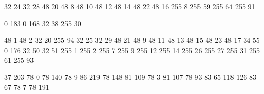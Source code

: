 




\startencoding[c-uni]

  32 24
  32 28
  48 20
  48  8
  48 10
  48 12
  48 14
  48 22
  48 16
 255  8
 255 59
 255 64
 255 91

   0 183
   0 168
  32  38
 255  30

  48   1
  48   2
  32  20
 255  94
  32  25
  32  29
  48  21
  48   9
  48  11
  48  13
  48  15
  48  23
  48  17
  34  55
   0 176
  32  50
  32  51
 255   1
 255   2
 255   7
 255   9
 255  12
 255  14
 255  26
 255  27
 255  31
 255  61
 255  93

   37 203
   78   0
   78 140
   78   9
   86 219
   78 148
   81 109
   78   3
   81 107
   78  93
   83  65
  118 126
   83  67
   78   7
   78 191

